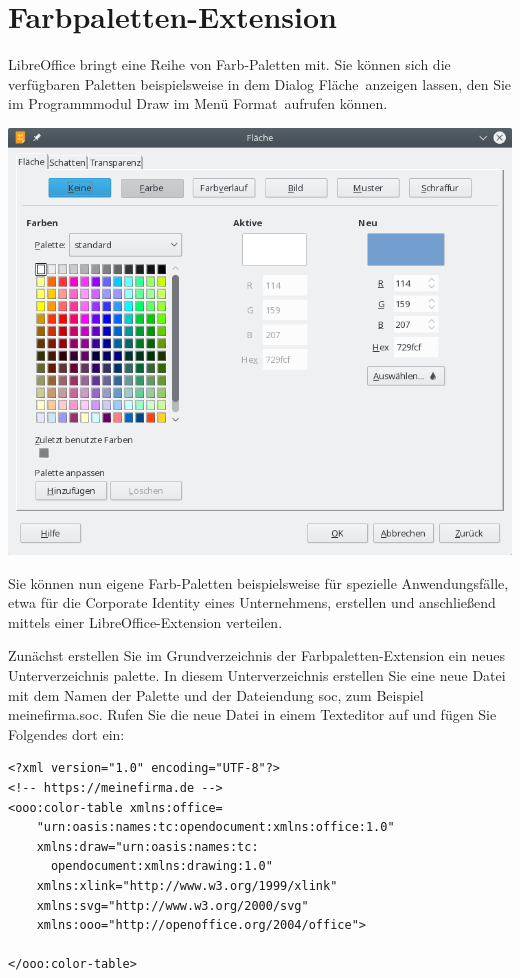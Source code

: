 \documentclass[a4paper,10pt,pagesize,titlepage]{scrbook}
\begin{document}
\section{Farbpaletten-Extension}

LibreOffice bringt eine Reihe von Farb-Paletten mit. Sie können sich die verfügbaren Paletten beispielsweise in dem Dialog \glqq Fläche\grqq~anzeigen lassen, den Sie im Programmmodul Draw im Menü \glqq Format\grqq~aufrufen können.

\begin{center}
	\captionsetup{type=figure}
	\includegraphics[width=0.9\linewidth]{pics/dialog_flaeche}
	\label{fig:dialog_flaeche}
\end{center}

Sie können nun eigene Farb-Paletten beispielsweise für spezielle Anwendungsfälle, etwa für die Corporate Identity eines Unternehmens, erstellen und anschließend mittels einer LibreOffice-Extension verteilen.

Zunächst erstellen Sie im Grundverzeichnis der Farbpaletten-Extension ein neues Unterverzeichnis \glqq palette\grqq. In diesem Unterverzeichnis erstellen Sie eine neue Datei mit dem Namen der Palette und der Dateiendung \glqq soc\grqq, zum Beispiel \glqq meinefirma.soc\grqq. Rufen Sie die neue Datei in einem Texteditor auf und fügen Sie Folgendes dort ein:

\begin{lstlisting}
<?xml version="1.0" encoding="UTF-8"?>
<!-- https://meinefirma.de -->
<ooo:color-table xmlns:office=
    "urn:oasis:names:tc:opendocument:xmlns:office:1.0"
    xmlns:draw="urn:oasis:names:tc:
      opendocument:xmlns:drawing:1.0"
    xmlns:xlink="http://www.w3.org/1999/xlink"
    xmlns:svg="http://www.w3.org/2000/svg"
    xmlns:ooo="http://openoffice.org/2004/office">
    
</ooo:color-table>
\end{lstlisting}
\end{document}
